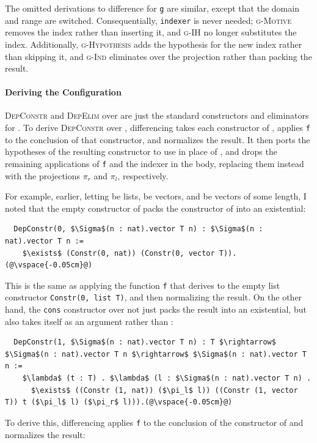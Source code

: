 The omitted derivations to difference for \lstinline{g} are similar,
except that the domain and range are switched. Consequentially, \lstinline{indexer} is never needed;
\textsc{g-Motive} removes the index rather than inserting it, and \textsc{g-IH} no longer substitutes the index.
Additionally, \textsc{g-Hypothesis} adds the hypothesis for the new index
rather than skipping it, and \textsc{g-Ind} eliminates over the projection rather than packing the result. %

\paragraph{Deriving the Configuration}
\textsc{DepConstr} and \textsc{DepElim} over \Aa are just the standard constructors and eliminators for \Aa.
To derive \textsc{DepConstr} over \B, differencing takes each constructor of \Aa,
applies \lstinline{f} to the conclusion of that constructor, and normalizes the result. %
It then ports the hypotheses of the resulting constructor to use \B in place of \Aa, and drops the remaining applications of \lstinline{f}
and the indexer in the body, replacing them instead with the projections $\pi_r$ and $\pi_l$, respectively.

For example, earlier, letting \Aa be lists, \AI be vectors, and \B be vectors of some length,
I noted that the empty constructor of \B packs the constructor of \AI into an existential:

\begin{lstlisting}
  DepConstr(0, $\Sigma$(n : nat).vector T n) : $\Sigma$(n : nat).vector T n :=
    $\exists$ (Constr(0, nat)) (Constr(0, vector T)).(@\vspace{-0.05cm}@)
\end{lstlisting}
This is the same as applying the function \lstinline{f} that \toolnamec derives to the empty list constructor 
\lstinline{Constr(0, list T)}, and then normalizing the result.
On the other hand, the \lstinline{cons} constructor over \B not just packs the result into an existential,
but also takes \B itself as an argument rather than \Aa:

\begin{lstlisting}
  DepConstr(1, $\Sigma$(n : nat).vector T n) : T $\rightarrow$ $\Sigma$(n : nat).vector T n $\rightarrow$ $\Sigma$(n : nat).vector T n :=
    $\lambda$ (t : T) . $\lambda$ (l : $\Sigma$(n : nat).vector T n) .
      $\exists$ ((Constr (1, nat)) ($\pi_l$ l)) ((Constr (1, vector T)) t ($\pi_l$ l) ($\pi_r$ l))).(@\vspace{-0.05cm}@)
\end{lstlisting}
To derive this, differencing applies \lstinline{f} to the conclusion of the constructor of \Aa and normalizes the result:


